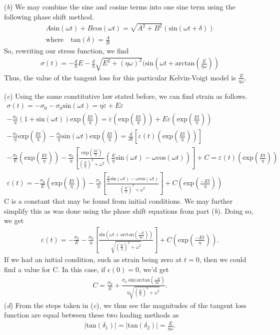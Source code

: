 (\textit{b}) We may combine the sine and cosine terms into one sine term using the following phase shift method.
\begin{gather*}
    A\text{sin}(\omega t)+B\text{cos}(\omega t)=\sqrt{A^2+B^2}(\text{sin}(\omega t + \delta))\\
    \text{where}\quad\text{tan}(\delta)=\frac{A}{B}
\end{gather*}
So, rewriting our stress function, we find
\begin{gather*}
    \sigma(t)=-\frac{d}{h}E-\frac{d}{h}\sqrt{E^2+(\eta\omega)^2}(\text{sin}(\omega t+ \text{arctan}(\frac{E}{\eta\omega}))
\end{gather*}
Thus, the value of the tangent loss for this particular Kelvin-Voigt model is $\frac{E}{\eta\omega}$.

(\textit{c}) Using the same constitutive law stated before, we can find strain as follows.
\begin{gather*}
    \sigma(t)=-\sigma_0-\sigma_0\text{sin}(\omega t)=\eta\dot{\varepsilon}+E\varepsilon\\
    -\frac{\sigma_0}{\eta}(1+\text{sin}(\omega t))\text{exp}(\frac{Et}{\eta})=\dot{\varepsilon}(\text{exp}(\frac{Et}{\eta}))+E\varepsilon(\text{exp}(\frac{Et}{\eta}))\\
    -\frac{\sigma_0}{\eta}\text{exp}(\frac{Et}{\eta})-\frac{\sigma_0}{\eta}\text{sin}(\omega t)\text{exp}(\frac{Et}{\eta})=\frac{d}{dt}[\varepsilon(t)(\text{exp}(\frac{Et}{\eta}))]\\
    -\frac{\sigma_0}{E}(\text{exp}(\frac{Et}{\eta}))-\frac{\sigma_0}{\eta}[\frac{\text{exp}(\frac{Et}{\eta})}{(\frac{E}{\eta})^2+\omega^2}(\frac{E}{\eta}\text{sin}(\omega t)-\omega\text{cos}(\omega t))]+C=\varepsilon(t)(\text{exp}(\frac{Et}{\eta}))\\
    \varepsilon(t)=-\frac{\sigma_0}{E}(\text{exp}(\frac{Et}{\eta}))-\frac{\sigma_0}{\eta}[\frac{\frac{E}{\eta}\text{sin}(\omega t)-\omega\text{cos}(\omega t)}{(\frac{E}{\eta})^2+\omega^2}]+C(\text{exp}(\frac{-Et}{\eta}))
\end{gather*}
C is a constant that may be found from initial conditions. We may further simplify this as was done using the phase shift equations from part (\textit{b}). Doing so, we get
\begin{gather*}
    \varepsilon(t)=-\frac{\sigma_0}{E}-\frac{\sigma_0}{\eta}[\frac{\text{sin}(\omega t+\text{arctan}(\frac{-E}{\eta\omega}))}{\sqrt{(\frac{E}{\eta})^2+\omega^2}}]+C(\text{exp}(\frac{-Et}{\eta})).
\end{gather*}
If we had an initial condition, such as strain being zero at $t=0$, then we could find a value for C. In this case, if $\epsilon(0)=0$, we'd get
\begin{gather*}
    C=\frac{\sigma_0}{E}+\frac{\sigma_0\text{ sin(arctan}(\frac{-E}{\eta\omega})}{\eta\sqrt{(\frac{E}{\eta})^2+\omega^2}}.
\end{gather*}
(\textit{d}) From the steps taken in (\textit{c}), we thus see the magnitudes of the tangent loss function are equal between these two loading methods as
\begin{gather*}
    |\text{tan}(\delta_1)|=|\text{tan}(\delta_2)|=\frac{E}{\eta\omega}.
\end{gather*}